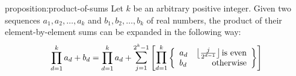 \documentclass[11pt,a4paper]{tesis}
\theoremstyle{plain}
\theoremstyle{definition}
\begin{document}
\begin{repproposition}{proposition:product-of-sums}
  Let $k$ be an arbitrary positive integer. Given two sequences $a_1, a_2, \dots, a_k$ and $b_1, b_2, \dots, b_k$ of real numbers, the product of their element-by-element sums can be expanded in the following way:
  \begin{equation*}
    \prod_{d = 1}^{k} a_d + b_d = \prod_{d = 1}^{k} a_d + \mathlarger{\sum}_{j = 1}^{2^k - 1} \left [ \mathlarger{\prod}_{d = 1}^{k}
      \left \{ \begin{array}{lr}
        a_d & \left \lfloor \frac{j}{2^{d - 1}} \right \rfloor \text{is even} \\
        b_d & \text{otherwise}
      \end{array} \right \} \right ]
  \end{equation*}
\end{repproposition}
\end{document}

